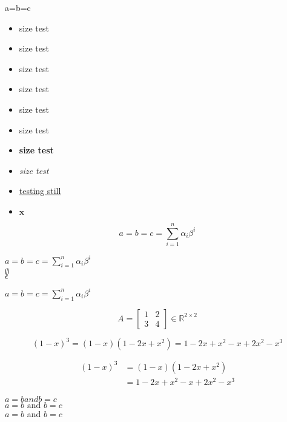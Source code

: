 \documentclass{article}
\begin{document}
a=b=c

\begin{itemize} \setlength\itemsep{0em}
    \item size test
    \item {\tiny size test}
    \item {\large size test}
    \item {\Large size test}
     \item {\LARGE size test}
     \item {\huge size test}
     \item {\bf size test}
     \item {\it size test}
     \item \underline{testing still}
     \item $\mathbf{x}$
\end{itemize}



\[ a=b=c=\sum_{i=1}^n \alpha_i \beta^i \]

$\displaystyle a=b=c=\sum_{i=1}^n \alpha_i \beta^i $\\

$\emptyset$\\
$\epsilon$

$ a=b=c=\sum_{i=1}^n \alpha_i \beta^i $

\[
A = \begin{bmatrix}
1 & 2 \\
3 & 4
\end{bmatrix} \in \mathbb{R}^{2\times 2} 
\]




\[ 
(1-x)^3 = (1-x)(1-2x+x^2) = 1-2x+x^2 -x +2x^2 -x^3
\]


\begin{align*}
(1-x)^3 &= (1-x)(1-2x+x^2)\\
        &= 1-2x+x^2 -x +2x^2 -x^3    
\end{align*}

$a=b and b=c$ \\

$a=b\text{ and }b=c$\\


$a=b$ and $b=c$
\end{document}
